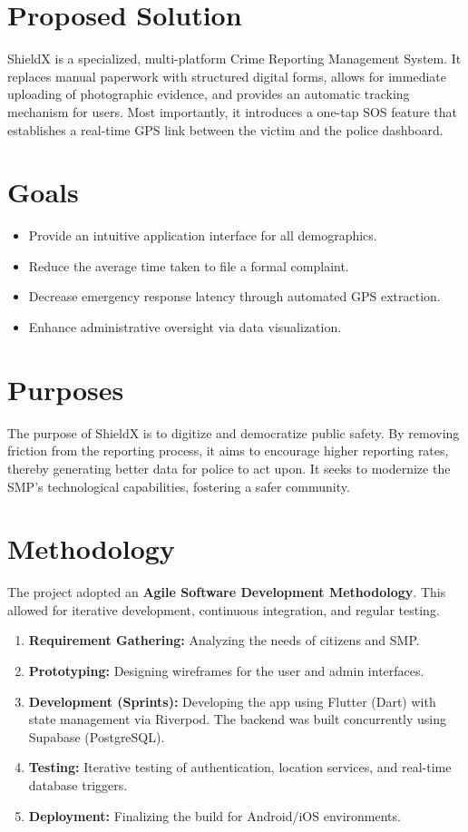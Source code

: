 \documentclass[11pt, a4paper]{report}
\begin{document}
\section{Proposed Solution}
ShieldX is a specialized, multi-platform Crime Reporting Management System. It replaces manual paperwork with structured digital forms, allows for immediate uploading of photographic evidence, and provides an automatic tracking mechanism for users. Most importantly, it introduces a one-tap SOS feature that establishes a real-time GPS link between the victim and the police dashboard.

\section{Goals}
\begin{itemize}
    \item Provide an intuitive application interface for all demographics.
    \item Reduce the average time taken to file a formal complaint.
    \item Decrease emergency response latency through automated GPS extraction.
    \item Enhance administrative oversight via data visualization.
\end{itemize}

\section{Purposes}
The purpose of ShieldX is to digitize and democratize public safety. By removing friction from the reporting process, it aims to encourage higher reporting rates, thereby generating better data for police to act upon. It seeks to modernize the SMP's technological capabilities, fostering a safer community.

\section{Methodology}
The project adopted an \textbf{Agile Software Development Methodology}. This allowed for iterative development, continuous integration, and regular testing.
\begin{enumerate}
    \item \textbf{Requirement Gathering:} Analyzing the needs of citizens and SMP.
    \item \textbf{Prototyping:} Designing wireframes for the user and admin interfaces.
    \item \textbf{Development (Sprints):} Developing the app using Flutter (Dart) with state management via Riverpod. The backend was built concurrently using Supabase (PostgreSQL).
    \item \textbf{Testing:} Iterative testing of authentication, location services, and real-time database triggers.
    \item \textbf{Deployment:} Finalizing the build for Android/iOS environments.
\end{enumerate}
\end{document}
